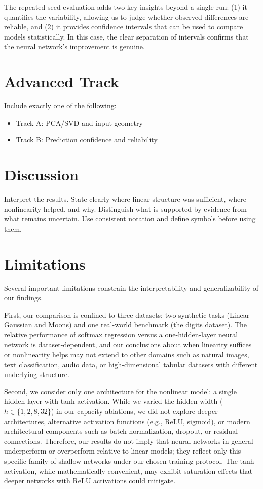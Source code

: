 \documentclass[11pt]{article}
\begin{document}
The repeated‑seed evaluation adds two key insights beyond a single run: (1) it quantifies the variability, allowing us to judge whether observed differences are reliable, and (2) it provides confidence intervals that can be used to compare models statistically. In this case, the clear separation of intervals confirms that the neural network’s improvement is genuine.

\section{Advanced Track}
Include exactly one of the following:
\begin{itemize}[leftmargin=1.4em]
    \item Track A: PCA/SVD and input geometry
    \item Track B: Prediction confidence and reliability
\end{itemize}

\section{Discussion}
Interpret the results. State clearly where linear structure was sufficient, where nonlinearity helped, and why. Distinguish what is supported by evidence from what remains uncertain. Use consistent notation and define symbols before using them.

\section{Limitations}

Several important limitations constrain the interpretability and generalizability of our findings.

First, our comparison is confined to three datasets: two synthetic tasks (Linear Gaussian and Moons) and one real-world benchmark (the digits dataset). The relative performance of softmax regression versus a one-hidden-layer neural network is dataset-dependent, and our conclusions about when linearity suffices or nonlinearity helps may not extend to other domains such as natural images, text classification, audio data, or high-dimensional tabular datasets with different underlying structure.

Second, we consider only one architecture for the nonlinear model: a single hidden layer with tanh activation. While we varied the hidden width ($h \in \{1,2,8,32\}$) in our capacity ablations, we did not explore deeper architectures, alternative activation functions (e.g., ReLU, sigmoid), or modern architectural components such as batch normalization, dropout, or residual connections. Therefore, our results do not imply that neural networks in general underperform or overperform relative to linear models; they reflect only this specific family of shallow networks under our chosen training protocol. The tanh activation, while mathematically convenient, may exhibit saturation effects that deeper networks with ReLU activations could mitigate.
\end{document}
